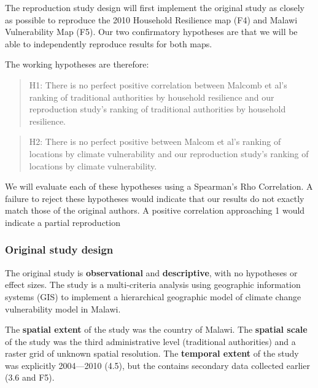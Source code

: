 \documentclass[
]{article}
\begin{document}
The reproduction study design will first implement the original study as
closely as possible to reproduce the 2010 Household Resilience map (F4)
and Malawi Vulnerability Map (F5). Our two confirmatory hypotheses are
that we will be able to independently reproduce results for both maps.

The working hypotheses are therefore:

\begin{quote}
H1: There is no perfect positive correlation between Malcomb et al's
ranking of traditional authorities by household resilience and our
reproduction study's ranking of traditional authorities by household
resilience.
\end{quote}

\begin{quote}
H2: There is no perfect positive between Malcom et al's ranking of
locations by climate vulnerability and our reproduction study's ranking
of locations by climate vulnerability.
\end{quote}

We will evaluate each of these hypotheses using a Spearman's Rho
Correlation. A failure to reject these hypotheses would indicate that
our results do not exactly match those of the original authors. A
positive correlation approaching 1 would indicate a partial reproduction

\hypertarget{original-study-design}{%
\subsubsection{Original study design}\label{original-study-design}}

The original study is \textbf{observational} and \textbf{descriptive},
with no hypotheses or effect sizes. The study is a multi-criteria
analysis using geographic information systems (GIS) to implement a
hierarchical geographic model of climate change vulnerability model in
Malawi.

The \textbf{spatial extent} of the study was the country of Malawi. The
\textbf{spatial scale} of the study was the third administrative level
(traditional authorities) and a raster grid of unknown spatial
resolution. The \textbf{temporal extent} of the study was explicitly
2004---2010 (4.5), but the contains secondary data collected earlier
(3.6 and F5).
\end{document}
